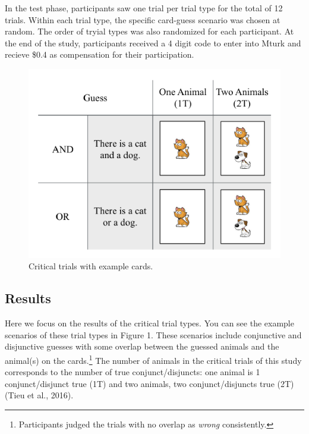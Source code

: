 \documentclass[10pt, letterpaper]{article}
\newenvironment{CodeChunk}{}{}
\begin{document}
In the test phase, participants saw one trial per trial type for the
total of 12 trials. Within each trial type, the specific card-guess
scenario was chosen at random. The order of tryial types was also
randomized for each participant. At the end of the study, participants
received a 4 digit code to enter into Mturk and recieve \$0.4 as
compensation for their participation.

\begin{CodeChunk}
\captionsetup{width=0.8\columnwidth}\begin{figure}[t]

{\centering \includegraphics{figs/critical-1} 

}

\caption[Critical trials with example cards]{Critical trials with example cards.}\label{fig:critical}
\end{figure}
\end{CodeChunk}

\subsection{Results}\label{results}

Here we focus on the results of the critical trial types. You can see
the example scenarios of these trial types in Figure 1. These scenarios
include conjunctive and disjunctive guesses with some overlap between
the guessed animals and the animal(s) on the cards.\footnote{Participants
  judged the trials with no overlap as \emph{wrong} consistently.} The
number of animals in the critical trials of this study corresponds to
the number of true conjunct/disjuncts: one animal is 1 conjunct/disjunct
true (1T) and two animals, two conjunct/disjuncts true (2T) (Tieu et
al., 2016).
\end{document}
